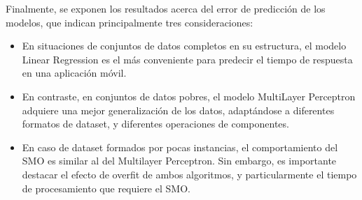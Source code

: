Finalmente, se exponen los resultados acerca del error de predicción
de los modelos, que indican principalmente tres consideraciones: 
\begin{itemize}
\item En situaciones de conjuntos de datos completos en su estructura, el
modelo Linear Regression es el más conveniente para predecir el tiempo
de respuesta en una aplicación móvil.
\item En contraste, en conjuntos de datos pobres, el modelo MultiLayer Perceptron
adquiere una mejor generalización de los datos, adaptándose a diferentes
formatos de dataset, y diferentes operaciones de componentes.
\item En caso de dataset formados por pocas instancias, el comportamiento
del \ac{SMO} es similar al del Multilayer Perceptron. Sin embargo,
es importante destacar el efecto de overfit de ambos algoritmos, y
particularmente el tiempo de procesamiento que requiere el \ac{SMO}. \end{itemize}

